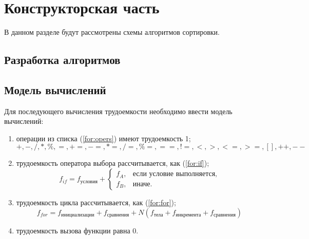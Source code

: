 \chapter{Конструкторская часть}

В данном разделе будут рассмотрены схемы алгоритмов сортировки.

\section{Разработка алгоритмов}


\clearpage
{}

\section{Модель вычислений}

Для последующего вычисления трудоемкости необходимо ввести модель вычислений:
\begin{enumerate}
    \item операции из списка (\ref{for:opers}) имеют трудоемкость 1;
        \begin{equation}
            \label{for:opers}
            +, -, /, *, \%, =, +=, -=, *=, /=, \%=, ==, !=, <, >, <=, >=, [], ++, {-}-
        \end{equation}
    \item трудоемкость оператора выбора  рассчитывается, как (\ref{for:if});
	\begin{equation}
        \label{for:if}
        f_{if} = f_{\text{условия}} +
        \begin{cases}
        f_A, & \text{если условие выполняется,}\\
        f_B, & \text{иначе.}
        \end{cases}
	\end{equation}
\item трудоемкость цикла рассчитывается, как (\ref{for:for});
    \begin{equation}
        \label{for:for}
        f_{for} = f_{\text{инициализации}} + f_{\text{сравнения}} + N(f_{\text{тела}} + f_{\text{инкремента}} + f_{\text{сравнения}})
    \end{equation}
	\item трудоемкость вызова функции равна 0.
\end{enumerate}


